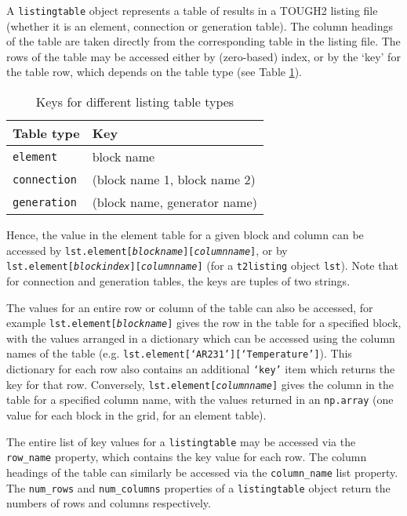 A \texttt{listingtable} object represents a table of results in a TOUGH2 listing file (whether it is an element, connection or generation table).  The column headings of the table are taken directly from the corresponding table in the listing file.  The rows of the table may be accessed either by (zero-based) index, or by the `key' for the table row, which depends on the table type (see Table \ref{tb:listing_table_keys}).

\begin{table}[h]
  \begin{center}
    \begin{tabular}{|l|l|}
      \hline
      \textbf{Table type} & \textbf{Key}\\
      \hline
      \texttt{element} & block name\\
      \texttt{connection} & (block name 1, block name 2)\\
      \texttt{generation} & (block name, generator name)\\
      \hline
    \end{tabular}
    \caption{Keys for different listing table types}
    \label{tb:listing_table_keys}
  \end{center}
\end{table}

Hence, the value in the element table for a given block and column can be accessed by \texttt{lst.element[\emph{blockname}][\emph{columnname}]}, or by \texttt{lst.element[\emph{blockindex}][\emph{columnname}]} (for a \texttt{t2listing} object \texttt{lst}).  Note that for connection and generation tables, the keys are tuples of two strings.

The values for an entire row or column of the table can also be accessed, for example \texttt{lst.element[\emph{blockname}]} gives the row in the table for a specified block, with the values arranged in a dictionary which can be accessed using the column names of the table (e.g. \texttt{lst.element[`AR231'][`Temperature']}).  This dictionary for each row also contains an additional \texttt{`key'} item which returns the key for that row.  Conversely, \texttt{lst.element[\emph{columnname}]} gives the column in the table for a specified column name, with the values returned in an \texttt{np.array} (one value for each block in the grid, for an element table).

The entire list of key values for a \texttt{listingtable} may be accessed via the \texttt{row\_name} property, which contains the key value for each row.  The column headings of the table can similarly be accessed via the \texttt{column\_name} list property.  The \texttt{num\_rows} and \texttt{num\_columns} properties of a \texttt{listingtable} object return the numbers of rows and columns respectively.

